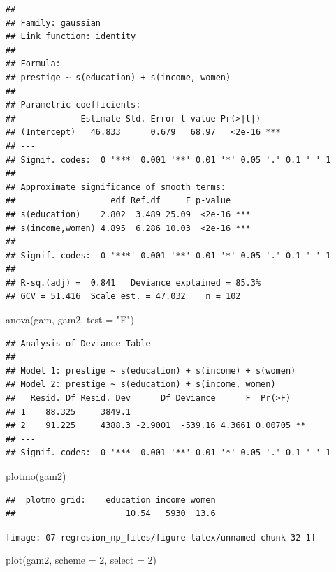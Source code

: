 \documentclass[
]{book}
\newenvironment{Shaded}{\begin{snugshade}}{\end{snugshade}}
\newcommand{\AttributeTok}[1]{\textcolor[rgb]{0.77,0.63,0.00}{#1}}
\newcommand{\DecValTok}[1]{\textcolor[rgb]{0.00,0.00,0.81}{#1}}
\newcommand{\FunctionTok}[1]{\textcolor[rgb]{0.00,0.00,0.00}{#1}}
\newcommand{\NormalTok}[1]{#1}
\newcommand{\StringTok}[1]{\textcolor[rgb]{0.31,0.60,0.02}{#1}}
\theoremstyle{break}
\theoremstyle{definition}
\theoremstyle{definition}
\theoremstyle{definition}
\theoremstyle{definition}
\theoremstyle{remark}
\begin{document}
\begin{verbatim}
## 
## Family: gaussian 
## Link function: identity 
## 
## Formula:
## prestige ~ s(education) + s(income, women)
## 
## Parametric coefficients:
##             Estimate Std. Error t value Pr(>|t|)    
## (Intercept)   46.833      0.679   68.97   <2e-16 ***
## ---
## Signif. codes:  0 '***' 0.001 '**' 0.01 '*' 0.05 '.' 0.1 ' ' 1
## 
## Approximate significance of smooth terms:
##                   edf Ref.df     F p-value    
## s(education)    2.802  3.489 25.09  <2e-16 ***
## s(income,women) 4.895  6.286 10.03  <2e-16 ***
## ---
## Signif. codes:  0 '***' 0.001 '**' 0.01 '*' 0.05 '.' 0.1 ' ' 1
## 
## R-sq.(adj) =  0.841   Deviance explained = 85.3%
## GCV = 51.416  Scale est. = 47.032    n = 102
\end{verbatim}

\begin{Shaded}
\begin{Highlighting}[]
\FunctionTok{anova}\NormalTok{(gam, gam2, }\AttributeTok{test =} \StringTok{"F"}\NormalTok{)}
\end{Highlighting}
\end{Shaded}

\begin{verbatim}
## Analysis of Deviance Table
## 
## Model 1: prestige ~ s(education) + s(income) + s(women)
## Model 2: prestige ~ s(education) + s(income, women)
##   Resid. Df Resid. Dev      Df Deviance      F  Pr(>F)   
## 1    88.325     3849.1                                   
## 2    91.225     4388.3 -2.9001  -539.16 4.3661 0.00705 **
## ---
## Signif. codes:  0 '***' 0.001 '**' 0.01 '*' 0.05 '.' 0.1 ' ' 1
\end{verbatim}

\begin{Shaded}
\begin{Highlighting}[]
\FunctionTok{plotmo}\NormalTok{(gam2)}
\end{Highlighting}
\end{Shaded}

\begin{verbatim}
##  plotmo grid:    education income women
##                      10.54   5930  13.6
\end{verbatim}

\begin{center}\texttt{[image: 07-regresion\_np\_files/figure-latex/unnamed-chunk-32-1]} \end{center}

\begin{Shaded}
\begin{Highlighting}[]
\FunctionTok{plot}\NormalTok{(gam2, }\AttributeTok{scheme =} \DecValTok{2}\NormalTok{, }\AttributeTok{select =} \DecValTok{2}\NormalTok{)}
\end{Highlighting}
\end{Shaded}
\end{document}
